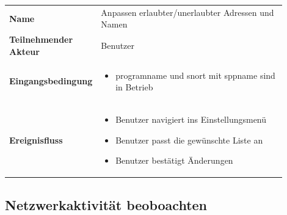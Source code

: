 \begin{tabular}{lp{0.9\linewidth}}

\textbf{Name} & Anpassen erlaubter/unerlaubter Adressen und Namen \\

\textbf{Teilnehmender Akteur} & Benutzer \\

\textbf{Eingangsbedingung} &
				\begin{minipage}[t]{\linewidth}
				\begin{itemize}[nosep,after=\strut,leftmargin=10pt]

				\item \gls{programname} und \gls{snort} mit \gls{sppname} sind in Betrieb

				\end{itemize}
				\end{minipage} \\
\textbf{Ereignisfluss} &
				\begin{minipage}[t]{\linewidth}
				\begin{itemize}[nosep,after=\strut,leftmargin=10pt]

				\item Benutzer navigiert ins Einstellungsmenü
				\item Benutzer passt die gewünschte Liste an
				\item Benutzer bestätigt Änderungen

				\end{itemize}
				\end{minipage} \\

\end{tabular}

\subsection{Netzwerkaktivität beoboachten}

